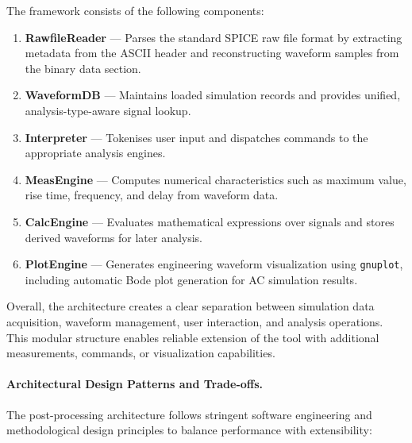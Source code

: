 The framework consists of the following components:

\begin{enumerate}
\item \textbf{RawfileReader} --- Parses the standard SPICE raw file format by extracting metadata from the ASCII header and reconstructing waveform samples from the binary data section.
\item \textbf{WaveformDB} --- Maintains loaded simulation records and provides unified, analysis-type-aware signal lookup.
\item \textbf{Interpreter} --- Tokenises user input and dispatches commands to the appropriate analysis engines.
\item \textbf{MeasEngine} --- Computes numerical characteristics such as maximum value, rise time, frequency, and delay from waveform data.
\item \textbf{CalcEngine} --- Evaluates mathematical expressions over signals and stores derived waveforms for later analysis.
\item \textbf{PlotEngine} --- Generates engineering waveform visualization using \texttt{gnuplot}, including automatic Bode plot generation for AC simulation results.
\end{enumerate}

Overall, the architecture creates a clear separation between simulation data acquisition, waveform management, user interaction, and analysis operations. This modular structure enables reliable extension of the tool with additional measurements, commands, or visualization capabilities.



\paragraph{Architectural Design Patterns and Trade-offs.}

The post-processing architecture follows stringent software engineering and methodological design principles to balance performance with extensibility:

